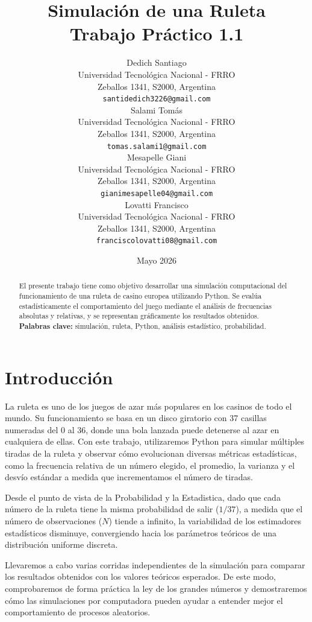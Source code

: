 \documentclass{article}
\title{\textbf{Simulación de una Ruleta} \\ \large Trabajo Práctico 1.1}
\author{
 Dedich Santiago \\
  Universidad Tecnológica Nacional - FRRO\\
  Zeballos 1341, S2000, Argentina\\
  \texttt{santidedich3226@gmail.com} \\
   \And
 Salami Tomás \\
  Universidad Tecnológica Nacional - FRRO\\
  Zeballos 1341, S2000, Argentina\\
  \texttt{tomas.salami1@gmail.com} \\
  \And
Mesapelle Giani\\
  Universidad Tecnológica Nacional - FRRO\\
  Zeballos 1341, S2000, Argentina\\
  \texttt{gianimesapelle04@gmail.com}\\
  \And
Lovatti Francisco\\
  Universidad Tecnológica Nacional - FRRO\\
  Zeballos 1341, S2000, Argentina\\
  \texttt{franciscolovatti08@gmail.com}\\
}
\date{Mayo 2026}
\begin{document}
\maketitle

\begin{abstract}
El presente trabajo tiene como objetivo desarrollar una simulación computacional del funcionamiento de una ruleta de casino europea utilizando Python. Se evalúa estadísticamente el comportamiento del juego mediante el análisis de frecuencias absolutas y relativas, y se representan gráficamente los resultados obtenidos.\\
\textbf{Palabras clave:} simulación, ruleta, Python, análisis estadístico, probabilidad.
\end{abstract}

\section{Introducción}
La ruleta es uno de los juegos de azar más populares en los casinos de todo el mundo. Su funcionamiento se basa en un disco giratorio con 37 casillas numeradas del 0 al 36, donde una bola lanzada puede detenerse al azar en cualquiera de ellas. Con este trabajo, utilizaremos Python para simular múltiples tiradas de la ruleta y observar cómo evolucionan diversas métricas estadísticas, como la frecuencia relativa de un número elegido, el promedio, la varianza y el desvío estándar a medida que incrementamos el número de tiradas.

Desde el punto de vista de la Probabilidad y la Estadistica, dado que cada número de la ruleta tiene la misma probabilidad de salir ($1/37$), a medida que el número de observaciones ($N$) tiende a infinito, la variabilidad de los estimadores estadísticos disminuye, convergiendo hacia los parámetros teóricos de una distribución uniforme discreta.  

Llevaremos a cabo varias corridas independientes de la simulación para comparar los resultados obtenidos con los valores teóricos esperados. De este modo, comprobaremos de forma práctica la ley de los grandes números y demostraremos cómo las simulaciones por computadora pueden ayudar a entender mejor el comportamiento de procesos aleatorios.
\end{document}
